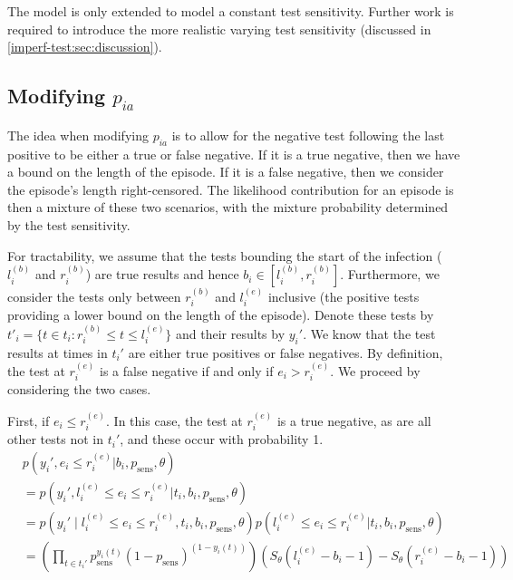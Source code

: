 \documentclass[thesis.tex]{subfiles}
\begin{document}
The model is only extended to model a constant test sensitivity.
Further work is required to introduce the more realistic varying test sensitivity (discussed in \cref{imperf-test:sec:discussion}).

\subsection{Modifying \texorpdfstring{$p_{ia}$}{pia}} \label{modifying-p_ia}

The idea when modifying $p_{ia}$ is to allow for the negative test
following the last positive to be either a true or false negative. If it
is a true negative, then we have a bound on the length of the episode.
If it is a false negative, then we consider the episode's length
right-censored. The likelihood contribution for an episode is then a
mixture of these two scenarios, with the mixture probability determined
by the test sensitivity.

For tractability, we assume that the tests bounding the start of the
infection ($l_i^{(b)}$ and $r_i^{(b)}$) are true results and hence
$b_i \in [l_i^{(b)}, r_i^{(b)}]$. Furthermore, we consider the tests
only between $r_i^{(b)}$ and $l_i^{(e)}$ inclusive (the positive
tests providing a lower bound on the length of the episode). Denote
these tests by
$t'_i = \{ t \in t_i : r_i^{(b)} \leq t \leq l_i^{(e)} \}$ and their
results by $y_i'$. We know that the test results at times in $t_i'$
are either true positives or false negatives. By definition, the test at
$r_i^{(e)}$ is a false negative if and only if $e_i > r_i^{(e)}$. We
proceed by considering the two cases.

First, if $e_i \leq r_i^{(e)}$. In this case, the test at
$r_i^{(e)}$ is a true negative, as are all other tests not in
$t_i'$, and these occur with probability 1.
\begin{align}
&p(y_i', e_i \leq r_i^{(e)} | b_i, p_\text{sens}, \theta) \\
&= p(y_i', l_i^{(e)} \leq e_i \leq r_i^{(e)} | t_i, b_i, p_\text{sens}, \theta) \\ %
&= p(y_i' \mid l_i^{(e)} \leq e_i \leq r_i^{(e)}, t_i, b_i, p_\text{sens}, \theta) p(l_i^{(e)} \leq e_i \leq r_i^{(e)} | t_i, b_i, p_\text{sens}, \theta) \\
&= \left( \prod_{t \in t_i'} p_\text{sens}^{y_i(t)} (1 - p_\text{sens})^{(1 - y_i(t))} \right) \left( S_\theta(l_i^{(e)} - b_i - 1) - S_\theta(r_i^{(e)} - b_i - 1) \right)
\end{align}
\end{document}
